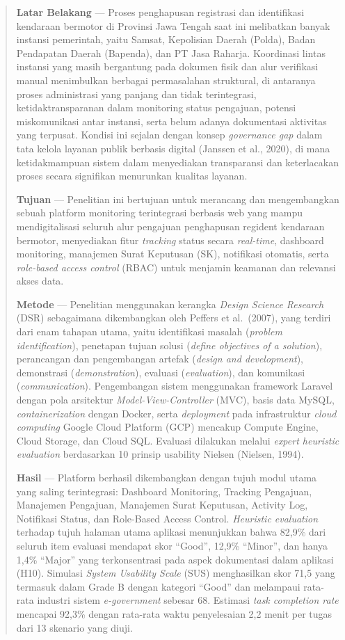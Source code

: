\documentclass[conference]{IEEEtran}
\begin{document}
\begin{abstract}
\textbf{Latar Belakang} --- Proses penghapusan registrasi dan
identifikasi kendaraan bermotor di Provinsi Jawa Tengah saat ini
melibatkan banyak instansi pemerintah, yaitu Samsat, Kepolisian
Daerah (Polda), Badan Pendapatan Daerah (Bapenda), dan PT Jasa Raharja.
Koordinasi lintas instansi yang masih bergantung pada dokumen fisik
dan alur verifikasi manual menimbulkan berbagai permasalahan struktural,
di antaranya proses administrasi yang panjang dan tidak terintegrasi,
ketidaktransparanan dalam monitoring status pengajuan, potensi
miskomunikasi antar instansi, serta belum adanya dokumentasi aktivitas
yang terpusat. Kondisi ini sejalan dengan konsep \emph{governance gap}
dalam tata kelola layanan publik berbasis digital (Janssen et al., 2020),
di mana ketidakmampuan sistem dalam menyediakan transparansi dan
keterlacakan proses secara signifikan menurunkan kualitas layanan.

\textbf{Tujuan} --- Penelitian ini bertujuan untuk merancang dan
mengembangkan sebuah platform monitoring terintegrasi berbasis web yang
mampu mendigitalisasi seluruh alur pengajuan penghapusan regident
kendaraan bermotor, menyediakan fitur \emph{tracking} status secara
\emph{real-time}, dashboard monitoring, manajemen Surat Keputusan (SK),
notifikasi otomatis, serta \emph{role-based access control} (RBAC)
untuk menjamin keamanan dan relevansi akses data.

\textbf{Metode} --- Penelitian menggunakan kerangka \emph{Design Science
Research} (DSR) sebagaimana dikembangkan oleh Peffers et al.~(2007),
yang terdiri dari enam tahapan utama, yaitu identifikasi masalah
(\emph{problem identification}), penetapan tujuan solusi (\emph{define
objectives of a solution}), perancangan dan pengembangan artefak
(\emph{design and development}), demonstrasi (\emph{demonstration}),
evaluasi (\emph{evaluation}), dan komunikasi (\emph{communication}).
Pengembangan sistem menggunakan framework Laravel dengan pola arsitektur
\emph{Model-View-Controller} (MVC), basis data MySQL, \emph{containerization}
dengan Docker, serta \emph{deployment} pada infrastruktur \emph{cloud computing}
Google Cloud Platform (GCP) mencakup Compute Engine, Cloud Storage, dan
Cloud SQL. Evaluasi dilakukan melalui \emph{expert heuristic evaluation}
berdasarkan 10 prinsip usability Nielsen (Nielsen, 1994).

\textbf{Hasil} --- Platform berhasil dikembangkan dengan tujuh modul
utama yang saling terintegrasi: Dashboard Monitoring, Tracking Pengajuan,
Manajemen Pengajuan, Manajemen Surat Keputusan, Activity Log, Notifikasi
Status, dan Role-Based Access Control. \emph{Heuristic evaluation}
terhadap tujuh halaman utama aplikasi menunjukkan bahwa 82,9\% dari
seluruh item evaluasi mendapat skor ``Good'', 12,9\% ``Minor'', dan
hanya 1,4\% ``Major'' yang terkonsentrasi pada aspek dokumentasi dalam
aplikasi (H10). Simulasi \emph{System Usability Scale} (SUS) menghasilkan
skor 71,5 yang termasuk dalam Grade B dengan kategori ``Good'' dan
melampaui rata-rata industri sistem \emph{e-government} sebesar 68.
Estimasi \emph{task completion rate} mencapai 92,3\% dengan rata-rata
waktu penyelesaian 2,2 menit per tugas dari 13 skenario yang diuji.


\end{abstract}
\end{document}
